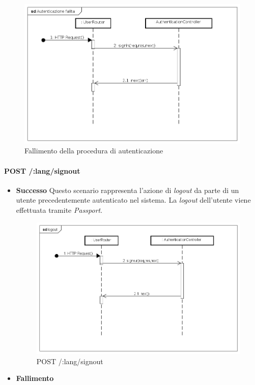 \begin{itemize}
\label{Fallimento della procedura di autenticazione}
\begin{figure}[ht]
	\centering
	\includegraphics[scale=0.40]{UML/DiagrammiDiSequenza/Back-end/POST__lang_signin_failure.png}
	\caption{Fallimento della procedura di autenticazione}
\end{figure}
\FloatBarrier

\end{itemize}

\paragraph{POST /:lang/signout}
\begin{itemize}
\item \textbf{Successo}
Questo scenario rappresenta l'azione di \textit{logout} da parte di un utente precedentemente autenticato nel sistema. La \textit{logout} dell'utente viene effettuata tramite \textit{Passport}.

\label{Procedura di logout}
\begin{figure}[ht]
	\centering
	\includegraphics[scale=0.40]{UML/DiagrammiDiSequenza/Back-end/POST__lang_signout_success.png}
	\caption{POST /:lang/signout}
\end{figure}
\FloatBarrier

\item \textbf{Fallimento}
\end{itemize}

